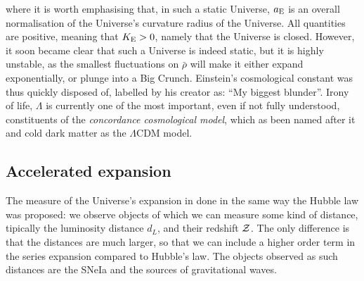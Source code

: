 where it is worth emphasising that, in such a static Universe, $a_{\mathrm{E}}$ is an overall normalisation of the Universe's curvature radius of the Universe. All quantities are positive, meaning that $K_{\mathrm{E}} > 0$, namely that the Universe is closed. However, it soon became clear that such a Universe is indeed static, but it is highly unstable, as the smallest fluctuations on $\bar{\rho}$ will make it either expand exponentially, or plunge into a Big Crunch. Einstein's cosmological constant was thus quickly disposed of, labelled by his creator as: ``My biggest blunder''. Irony of life, $\Lambda$ is currently one of the most important, even if not fully understood, constituents of the \emph{concordance cosmological model}, which as been named after it and cold dark matter as the $\Lambda$CDM model.

\subsection{Accelerated expansion}
The measure of the Universe's expansion in done in the same way the Hubble law was proposed: we observe objects of which we can measure some kind of distance, tipically the luminosity distance $d_L$, and their redshift $\mathcal{Z}$. The only difference is that the distances are much larger, so that we can include a higher order term in the series expansion compared to Hubble's law. The objects observed as such distances are the SNeIa and the sources of gravitational waves. 

